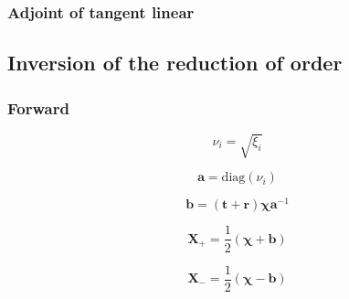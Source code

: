 %
\subsubsection{Adjoint of tangent linear}
\label{sec:eigen_problem-reduction_of_order-adjoint_of_tangent_linear}


%
\subsection{Inversion of the reduction of order}
\label{sec:eigen_problem-invert_reduction_of_order}


\subsubsection{Forward}
\label{sec:eigen_problem-invert_reduction_of_order-forward}

\begin{equation}
\nu_{i} = \sqrt{\xi_{i}}
\label{eq:eigen_problem-invert_reduction_of_order-forward_nu}
\end{equation}

\begin{equation}
\mathbf{a} = \mathrm{diag}(\nu_{i})
\label{eq:eigen_problem-invert_reduction_of_order-forward_a}
\end{equation}

\begin{equation}
\mathbf{b} = (\mathbf{t} + \mathbf{r})\boldsymbol{\chi}\mathbf{a}^{-1}
\label{eq:eigen_problem-invert_reduction_of_order-forward_b}
\end{equation}

\begin{equation}
\mathbf{X}_{+} = \frac{1}{2} (\boldsymbol{\chi} + \mathbf{b})
\label{eq:eigen_problem-invert_reduction_of_order-forward_x_p}
\end{equation}

\begin{equation}
\mathbf{X}_{-} = \frac{1}{2} (\boldsymbol{\chi} - \mathbf{b})
\label{eq:eigen_problem-invert_reduction_of_order-forward_x_m}
\end{equation}


%
